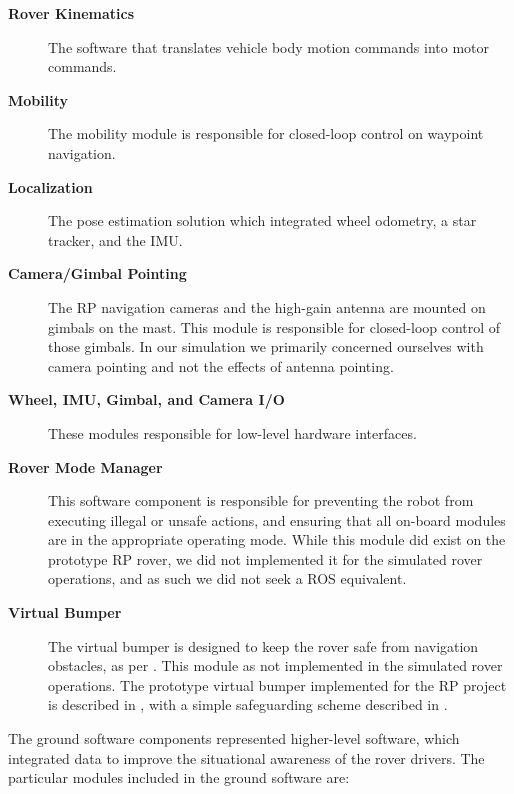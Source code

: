 \documentclass[twocolumn,letterpaper]{IEEEAerospaceCLS}  %
\begin{document}
\begin{description}
\item[\textbf{Rover Kinematics}] The software that translates vehicle body motion commands into motor commands.
\item[\textbf{Mobility}] The mobility module is responsible for closed-loop control on waypoint navigation.
\item[\textbf{Localization}]  The pose estimation solution which integrated wheel odometry, a star tracker, and the IMU.  
\item[\textbf{Camera/Gimbal Pointing}] The RP navigation cameras and the high-gain antenna are mounted on gimbals on the mast. This module is responsible for closed-loop control of those gimbals.  In our simulation we primarily concerned ourselves with camera pointing and not the effects of antenna pointing.  
\item[\textbf{Wheel, IMU, Gimbal, and Camera I/O}]  These modules responsible for low-level hardware interfaces.  
\item[\textbf{Rover Mode Manager}] This software component is responsible for preventing the robot from executing illegal or unsafe actions, and ensuring that all on-board modules are in the appropriate operating mode.  While this module did exist on the prototype RP rover, we did not implemented it for the simulated rover operations, and as such we did not seek a ROS equivalent.
\item[\textbf{Virtual Bumper}]  The virtual bumper is designed to keep the rover safe from navigation obstacles, as per \cite{matthies1997fast}. This module as not implemented in the simulated rover operations. The prototype virtual bumper implemented for the RP project is described in \cite{nefian2017structured}, with a simple safeguarding scheme described in \cite{furlong2016safeguarding}.
\end{description}


The ground software components represented higher-level software, which integrated data to improve the situational awareness of the rover drivers.  The particular modules included in the ground software are:
\end{document}
